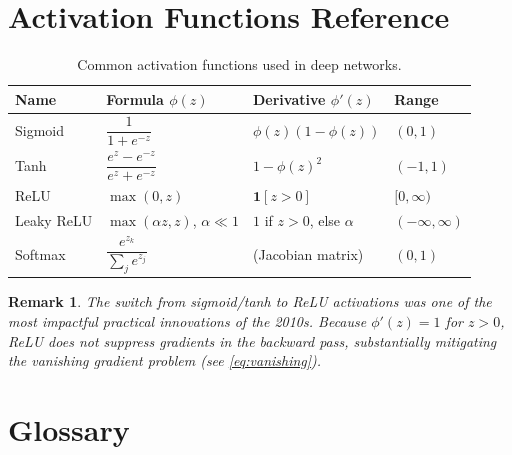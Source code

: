 \documentclass[12pt,a4paper]{article}
\newtheorem{remark}{Remark}[section]
\begin{document}
\newpage
\appendix

\section{Activation Functions Reference}
\label{app:activations}

\begin{table}[ht]
\centering
\caption{Common activation functions used in deep networks.}
\label{tab:activations}
\begin{tabular}{llll}
\toprule
\textbf{Name} & \textbf{Formula} $\phi(z)$ & \textbf{Derivative} $\phi'(z)$ & \textbf{Range} \\
\midrule
Sigmoid   & $\dfrac{1}{1+e^{-z}}$          & $\phi(z)(1-\phi(z))$          & $(0,1)$ \\[8pt]
Tanh      & $\dfrac{e^z - e^{-z}}{e^z+e^{-z}}$ & $1-\phi(z)^2$            & $(-1,1)$ \\[8pt]
ReLU      & $\max(0,z)$                     & $\mathbf{1}[z>0]$             & $[0,\infty)$ \\[8pt]
Leaky ReLU & $\max(\alpha z,z)$, $\alpha\ll 1$ & $1$ if $z>0$, else $\alpha$ & $(-\infty,\infty)$ \\[8pt]
Softmax   & $\dfrac{e^{z_k}}{\sum_j e^{z_j}}$ & (Jacobian matrix)          & $(0,1)$ \\
\bottomrule
\end{tabular}
\end{table}

\begin{remark}
\label{rem:relu}
The switch from sigmoid/tanh to ReLU activations was one of the most
impactful practical innovations of the 2010s.  Because $\phi'(z)=1$ for
$z>0$, ReLU does not suppress gradients in the backward pass, substantially
mitigating the vanishing gradient problem (see \cref{eq:vanishing}).
\end{remark}

\section{Glossary}
\label{app:glossary}
\end{document}
